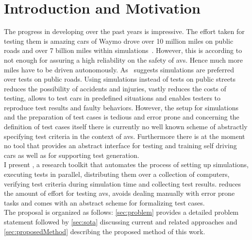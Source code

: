 \section{Introduction and Motivation}
The progress in developing  over the past years is impressive.
The effort taken for testing them is amazing \eg{} cars of Waymo drove over 10 million miles on public roads and over 7 billion miles within simulations~\cite{waymoMillions}.
However, this is according to~\cite{millions} not enough for assuring a high reliability on the safety of \glspl{av}.
Hence much more miles have to be driven autonomously.
As~\cite{waymoMillions} suggests simulations are preferred over tests on public roads.
Using simulations instead of tests on public streets reduces the possibility of accidents and injuries, vastly reduces the costs of testing, allows to test cars in predefined situations and enables testers to reproduce test results and faulty behaviors.
However, the setup for simulations and the preparation of test cases is tedious and error prone and concerning the definition of test cases itself there is currently no well known scheme of abstractly specifying test criteria in the context of \glspl{av}.
Furthermore there is at the moment no tool that provides an abstract interface for testing and training self driving cars as well as for supporting test generation.\\
I present \drivebuild{}, a research toolkit that automates the process of setting up simulations, executing tests in parallel, distributing them over a collection of computers, verifying test criteria during simulation time and collecting test results.
\drivebuild{} reduces the amount of effort for testing \glspl{av}, avoids dealing manually with error prone tasks and comes with an abstract scheme for formalizing test cases.\\
The proposal is organized as follows: \autoref{sec:problem} provides a detailed problem statement followed by \autoref{sec:sota} discussing current and related approaches and \autoref{sec:proposedMethod} describing the proposed method of this work.
